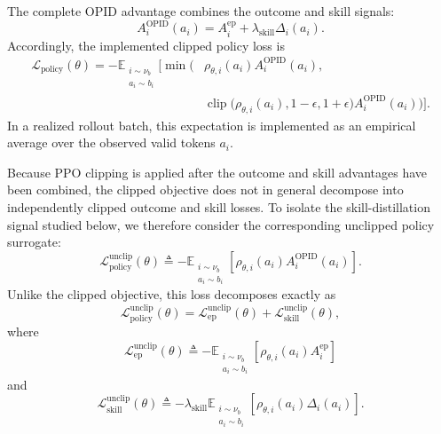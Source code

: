 \documentclass{llmxive}
\begin{document}
The complete OPID advantage combines the outcome and skill signals:
\begin{equation*}
 A_i^{\mathrm{OPID}}(a_i)
 =
 A_i^{\mathrm{ep}}
 +
 \lambda_{\mathrm{skill}}\Delta_i(a_i).
\end{equation*}
Accordingly, the implemented clipped policy loss is
\begin{equation*}
\begin{aligned}
 \mathcal L_{\mathrm{policy}}(\theta)
 =
 -
 \mathbb E_{\substack{i\sim\nu_b\\a_i\sim b_i}}
 \Big[
 \min\Big(
   &\rho_{\theta,i}(a_i)
    A_i^{\mathrm{OPID}}(a_i),
 \\
   &\operatorname{clip}
   \bigl(
     \rho_{\theta,i}(a_i),
     1-\epsilon,
     1+\epsilon
   \bigr)
   A_i^{\mathrm{OPID}}(a_i)
 \Big)
 \Big].
\end{aligned}
\end{equation*}
In a realized rollout batch, this expectation is implemented as an
empirical average over the observed valid tokens \(a_i\).

Because PPO clipping is applied after the outcome and skill advantages
have been combined, the clipped objective does not in general decompose
into independently clipped outcome and skill losses. To isolate the
skill-distillation signal studied below, we therefore consider the
corresponding unclipped policy surrogate:
\begin{equation*}
 \mathcal L_{\mathrm{policy}}^{\mathrm{unclip}}(\theta)
 \triangleq
 -
 \mathbb E_{\substack{i\sim\nu_b\\a_i\sim b_i}}
 \left[
   \rho_{\theta,i}(a_i)
   A_i^{\mathrm{OPID}}(a_i)
 \right].
\end{equation*}
Unlike the clipped objective, this loss decomposes exactly as
\begin{equation*}
 \mathcal L_{\mathrm{policy}}^{\mathrm{unclip}}(\theta)
 =
 \mathcal L_{\mathrm{ep}}^{\mathrm{unclip}}(\theta)
 +
 \mathcal L_{\mathrm{skill}}^{\mathrm{unclip}}(\theta),
\end{equation*}
where
\begin{equation*}
 \mathcal L_{\mathrm{ep}}^{\mathrm{unclip}}(\theta)
 \triangleq
 -
 \mathbb E_{\substack{i\sim\nu_b\\a_i\sim b_i}}
 \left[
   \rho_{\theta,i}(a_i)A_i^{\mathrm{ep}}
 \right]
\end{equation*}
and
\begin{equation}
 \mathcal L_{\mathrm{skill}}^{\mathrm{unclip}}(\theta)
 \triangleq
 -
 \lambda_{\mathrm{skill}}
 \mathbb E_{\substack{i\sim\nu_b\\a_i\sim b_i}}
 \left[
   \rho_{\theta,i}(a_i)\Delta_i(a_i)
 \right].
\label{eq:opid_unclipped_skill_loss}
\end{equation}
\end{document}
